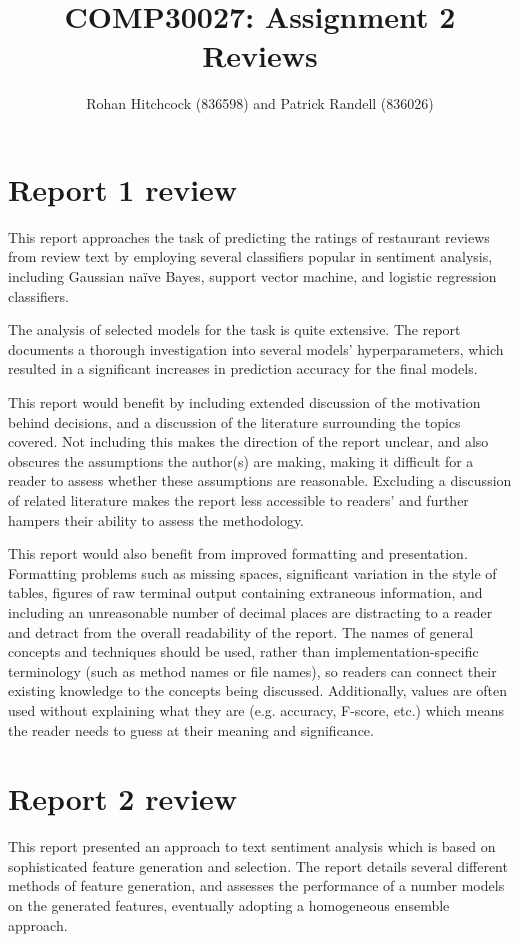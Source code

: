 \documentclass[11pt]{article}
\begin{document}
\title{\textbf{COMP30027: Assignment 2 Reviews}}
\author{Rohan Hitchcock (836598) and Patrick Randell (836026)}
\date{}
\maketitle

\section*{Report 1 review}

This report approaches the task of predicting the ratings of restaurant reviews from review text by employing several classifiers popular in sentiment analysis, including Gaussian na\"{i}ve Bayes, support vector machine, and logistic regression classifiers. 

The analysis of selected models for the task is quite extensive. The report documents a thorough investigation into several models' hyperparameters, which resulted in a significant increases in prediction accuracy for the final models.

This report would benefit by including extended discussion of the motivation behind decisions, and a discussion of the literature surrounding the topics covered. Not including this makes the direction of the report unclear, and also obscures the assumptions the author(s) are making, making it difficult for a reader to assess whether these assumptions are reasonable. Excluding a discussion of related literature makes the report less accessible to readers' and further hampers their ability to assess the methodology. 

This report would also benefit from improved formatting and presentation. Formatting problems such as missing spaces, significant variation in the style of tables, figures of raw terminal output containing extraneous information, and including an unreasonable number of decimal places are distracting to a reader and detract from the overall readability of the report. The names of general concepts and techniques should be used, rather than implementation-specific terminology (such as method names or file names), so readers can connect their existing knowledge to the concepts being discussed. Additionally, values are often used without explaining what they are (e.g. accuracy, F-score, etc.) which means the reader needs to guess at their meaning and significance.

\section*{Report 2 review}
This report presented an approach to text sentiment analysis which is based on sophisticated feature generation and selection. The report details several different methods of feature generation, and assesses the performance of a number models on the generated features, eventually adopting a homogeneous ensemble approach.
\end{document}
